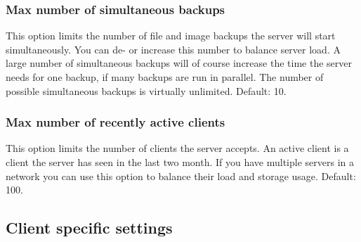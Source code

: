 \documentclass[a4paper,10pt]{article}
\begin{document}
\subsubsection{Max number of simultaneous backups}

This option limits the number of file and image backups the server will start simultaneously. You can de- or increase this number to balance server load. A large number of simultaneous backups will of course increase the time the server needs for one backup, if many backups are run in parallel. The number of possible simultaneous backups is virtually unlimited. Default: 10.

\subsubsection{Max number of recently active clients}

This option limits the number of clients the server accepts. An active client is a client the server has seen in the last two month. If you have multiple servers in a network you can use this option to balance their load and storage usage. Default: 100.

\subsection{Client specific settings}
\end{document}
